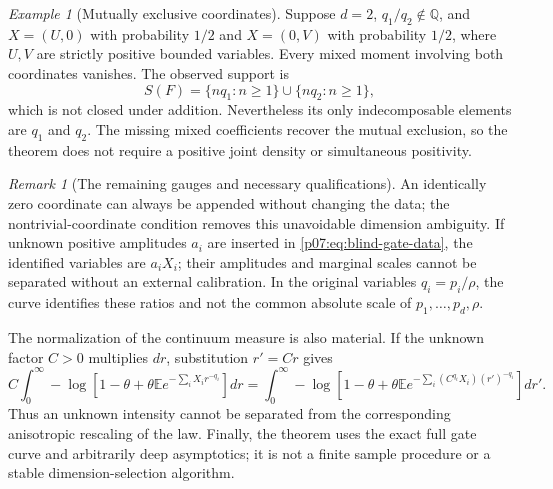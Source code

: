 \documentclass[11pt,letterpaper]{article}
\theoremstyle{definition}
\theoremstyle{remark}
\newtheorem{remark}[theorem]{Remark}
\newtheorem{example}[theorem]{Example}
\newcommand{\E}{\mathbb E}
\newcommand{\1}{\mathbf 1}
\begin{document}
\begin{example}[Mutually exclusive coordinates]
Suppose $d=2$, $q_1/q_2\notin\mathbb Q$, and
$X=(U,0)$ with probability $1/2$ and $X=(0,V)$ with probability
$1/2$, where $U,V$ are strictly positive bounded variables. Every mixed
moment involving both coordinates vanishes. The observed support is
\[
 S(F)=\{nq_1:n\geq1\}\cup\{nq_2:n\geq1\},
\]
which is not closed under addition. Nevertheless its only
indecomposable elements are $q_1$ and $q_2$. The missing mixed
coefficients recover the mutual exclusion, so the theorem does not
require a positive joint density or simultaneous positivity.
\end{example}

\begin{remark}[The remaining gauges and necessary qualifications]
An identically zero coordinate can always be appended without changing
the data; the nontrivial-coordinate condition removes this unavoidable
dimension ambiguity. If unknown positive amplitudes $a_i$ are inserted
in \eqref{p07:eq:blind-gate-data}, the identified variables are $a_iX_i$;
their amplitudes and marginal scales cannot be separated without an
external calibration. In the original variables $q_i=p_i/\rho$, the
curve identifies these ratios and not the common absolute scale of
$p_1,\ldots,p_d,\rho$.

The normalization of the continuum measure is also material. If the
unknown factor $C>0$ multiplies $dr$, substitution $r'=Cr$ gives
\[
 C\int_0^\infty-\log\left[1-\theta+
     \theta\E e^{-\sum_iX_i r^{-q_i}}\right]dr
 =\int_0^\infty-\log\left[1-\theta+
     \theta\E e^{-\sum_i(C^{q_i}X_i)(r')^{-q_i}}\right]dr'.
\]
Thus an unknown intensity cannot be separated from the corresponding
anisotropic rescaling of the law. Finally, the theorem uses the exact
full gate curve and arbitrarily deep asymptotics; it is not a finite
sample procedure or a stable dimension-selection algorithm.
\end{remark}
\end{document}
